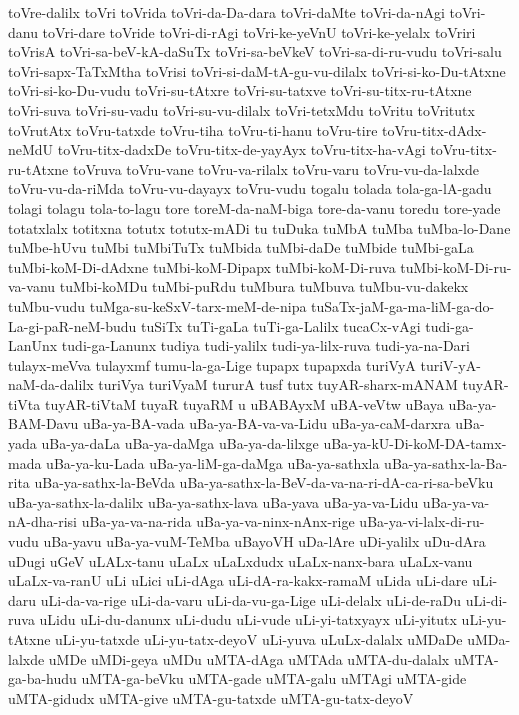 {toVre-dalilx
toVri
toVrida
toVri-da-Da-dara
toVri-daMte
toVri-da-nAgi
toVri-danu
toVri-dare
toVride
toVri-di-rAgi
toVri-ke-yeVnU
toVri-ke-yelalx
toVriri
toVrisA
toVri-sa-beV-kA-daSuTx
toVri-sa-beVkeV
toVri-sa-di-ru-vudu
toVri-salu
toVri-sapx-TaTxMtha
toVrisi
toVri-si-daM-tA-gu-vu-dilalx
toVri-si-ko-Du-tAtxne
toVri-si-ko-Du-vudu
toVri-su-tAtxre
toVri-su-tatxve
toVri-su-titx-ru-tAtxne
toVri-suva
toVri-su-vadu
toVri-su-vu-dilalx
toVri-tetxMdu
toVritu
toVritutx
toVrutAtx
toVru-tatxde
toVru-tiha
toVru-ti-hanu
toVru-tire
toVru-titx-dAdx-neMdU
toVru-titx-dadxDe
toVru-titx-de-yayAyx
toVru-titx-ha-vAgi
toVru-titx-ru-tAtxne
toVruva
toVru-vane
toVru-va-rilalx
toVru-varu
toVru-vu-da-lalxde
toVru-vu-da-riMda
toVru-vu-dayayx
toVru-vudu
togalu
tolada
tola-ga-lA-gadu
tolagi
tolagu
tola-to-lagu
tore
toreM-da-naM-biga
tore-da-vanu
toredu
tore-yade
totatxlalx
totitxna
totutx
totutx-mADi
tu
tuDuka
tuMbA
tuMba
tuMba-lo-Dane
tuMbe-hUvu
tuMbi
tuMbiTuTx
tuMbida
tuMbi-daDe
tuMbide
tuMbi-gaLa
tuMbi-koM-Di-dAdxne
tuMbi-koM-Dipapx
tuMbi-koM-Di-ruva
tuMbi-koM-Di-ru-va-vanu
tuMbi-koMDu
tuMbi-puRdu
tuMbura
tuMbuva
tuMbu-vu-dakekx
tuMbu-vudu
tuMga-su-keSxV-tarx-meM-de-nipa
tuSaTx-jaM-ga-ma-liM-ga-do-La-gi-paR-neM-budu
tuSiTx
tuTi-gaLa
tuTi-ga-Lalilx
tucaCx-vAgi
tudi-ga-LanUnx
tudi-ga-Lanunx
tudiya
tudi-yalilx
tudi-ya-lilx-ruva
tudi-ya-na-Dari
tulayx-meVva
tulayxmf
tumu-la-ga-Lige
tupapx
tupapxda
turiVyA
turiV-yA-naM-da-dalilx
turiVya
turiVyaM
tururA
tusf
tutx
tuyAR-sharx-mANAM
tuyAR-tiVta
tuyAR-tiVtaM
tuyaR
tuyaRM
u
uBABAyxM
uBA-veVtw
uBaya
uBa-ya-BAM-Davu
uBa-ya-BA-vada
uBa-ya-BA-va-va-Lidu
uBa-ya-caM-darxra
uBa-yada
uBa-ya-daLa
uBa-ya-daMga
uBa-ya-da-lilxge
uBa-ya-kU-Di-koM-DA-tamx-mada
uBa-ya-ku-Lada
uBa-ya-liM-ga-daMga
uBa-ya-sathxla
uBa-ya-sathx-la-Ba-rita
uBa-ya-sathx-la-BeVda
uBa-ya-sathx-la-BeV-da-va-na-ri-dA-ca-ri-sa-beVku
uBa-ya-sathx-la-dalilx
uBa-ya-sathx-lava
uBa-yava
uBa-ya-va-Lidu
uBa-ya-va-nA-dha-risi
uBa-ya-va-na-rida
uBa-ya-va-ninx-nAnx-rige
uBa-ya-vi-lalx-di-ru-vudu
uBa-yavu
uBa-ya-vuM-TeMba
uBayoVH
uDa-lAre
uDi-yalilx
uDu-dAra
uDugi
uGeV
uLALx-tanu
uLaLx
uLaLxdudx
uLaLx-nanx-bara
uLaLx-vanu
uLaLx-va-ranU
uLi
uLici
uLi-dAga
uLi-dA-ra-kakx-ramaM
uLida
uLi-dare
uLi-daru
uLi-da-va-rige
uLi-da-varu
uLi-da-vu-ga-Lige
uLi-delalx
uLi-de-raDu
uLi-di-ruva
uLidu
uLi-du-danunx
uLi-dudu
uLi-vude
uLi-yi-tatxyayx
uLi-yitutx
uLi-yu-tAtxne
uLi-yu-tatxde
uLi-yu-tatx-deyoV
uLi-yuva
uLuLx-dalalx
uMDaDe
uMDa-lalxde
uMDe
uMDi-geya
uMDu
uMTA-dAga
uMTAda
uMTA-du-dalalx
uMTA-ga-ba-hudu
uMTA-ga-beVku
uMTA-gade
uMTA-galu
uMTAgi
uMTA-gide
uMTA-gidudx
uMTA-give
uMTA-gu-tatxde
uMTA-gu-tatx-deyoV
}
